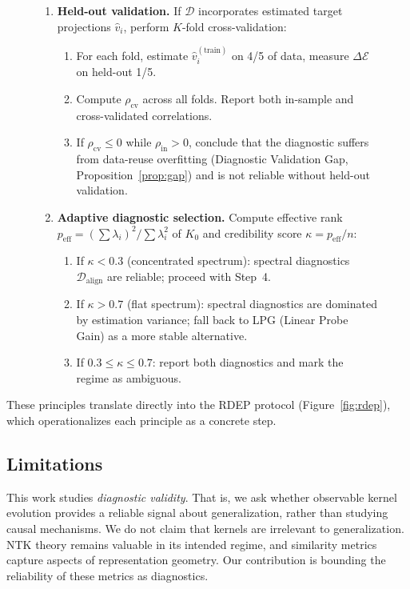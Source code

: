 \documentclass[twoside,11pt]{article}
\begin{document}
\begin{figure}[t]
{\begin{minipage}{0.92\textwidth}
\begin{enumerate}
    \item \textbf{Held-out validation.}
    If $\mathcal{D}$ incorporates estimated target projections $\hat{v}_i$, perform $K$-fold cross-validation:
    \begin{enumerate}
        \item For each fold, estimate $\hat{v}_i^{(\text{train})}$ on 4/5 of data, measure $\Delta\mathcal{E}$ on held-out 1/5.
        \item Compute $\rho_{\text{cv}}$ across all folds.  Report both in-sample and cross-validated correlations.
        \item If $\rho_{\text{cv}} \leq 0$ while $\rho_{\text{in}} > 0$, conclude that the diagnostic suffers from data-reuse overfitting (Diagnostic Validation Gap, Proposition~\ref{prop:gap}) and is not reliable without held-out validation.
    \end{enumerate}
    \item \textbf{Adaptive diagnostic selection.}
    Compute effective rank $p_{\text{eff}} = (\sum \lambda_i)^2 / \sum \lambda_i^2$ of $K_0$ and credibility score $\kappa = p_{\text{eff}} / n$:
    \begin{enumerate}
        \item If $\kappa < 0.3$ (concentrated spectrum): spectral diagnostics $\mathcal{D}_{\text{align}}$ are reliable; proceed with Step~4.
        \item If $\kappa > 0.7$ (flat spectrum): spectral diagnostics are dominated by estimation variance; fall back to LPG (Linear Probe Gain) as a more stable alternative.
        \item If $0.3 \leq \kappa \leq 0.7$: report both diagnostics and mark the regime as ambiguous.
    \end{enumerate}
\end{enumerate}
\end{minipage}}
\end{figure}

These principles translate directly into the RDEP protocol (Figure~\ref{fig:rdep}), which operationalizes each principle as a concrete step.

\subsection{Limitations}
This work studies \emph{diagnostic validity}. That is, we ask whether observable kernel evolution provides a reliable signal about generalization, rather than studying causal mechanisms.  We do not claim that kernels are irrelevant to generalization. NTK theory remains valuable in its intended regime, and similarity metrics capture aspects of representation geometry.  Our contribution is bounding the reliability of these metrics as diagnostics.
\end{document}
